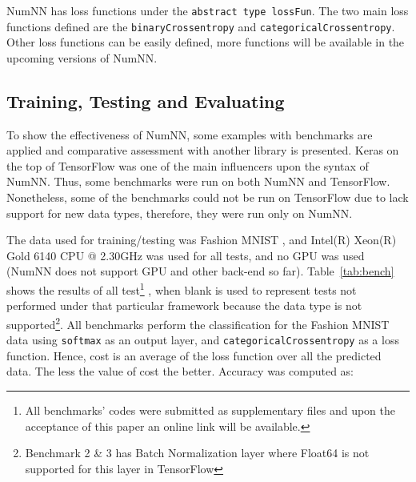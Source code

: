 NumNN has loss functions under the \texttt{abstract type lossFun}. The two main loss functions defined are the \texttt{binaryCrossentropy} and \texttt{categoricalCrossentropy}. Other loss functions can be easily defined, more functions will be available in the upcoming versions of NumNN.


\subsection{Training, Testing and Evaluating}
To show the effectiveness of NumNN, some examples with benchmarks are applied and comparative assessment with another library is presented. Keras \cite{Collet2015} on the top of TensorFlow was one of the main influencers upon the syntax of NumNN. Thus, some benchmarks were run on both NumNN and TensorFlow. Nonetheless, some of the benchmarks could not be run on TensorFlow due to lack support for new data types, therefore, they were run only on NumNN.

The data used for training/testing was Fashion MNIST \cite{Xiao2017}, and Intel(R) Xeon(R) Gold 6140 CPU @ 2.30GHz was used for all tests, and no GPU was used (NumNN does not support GPU and other back-end so far). Table~\ref{tab:bench} shows the results of all test\footnote{All benchmarks' codes were submitted as supplementary files and upon the acceptance of this paper an online link will be available.}
, when blank is used to represent tests not performed under that particular framework because the data type is not supported\footnote{\label{batchnorm}Benchmark 2 \& 3 has Batch Normalization layer where Float64 is not supported for this layer in TensorFlow}. All benchmarks perform the classification for the Fashion MNIST data using \texttt{softmax} as an output layer, and \texttt{categoricalCrossentropy} as a loss function. Hence, cost is an average of the loss function over all the predicted data. The less the value of cost the better. Accuracy was computed as:

